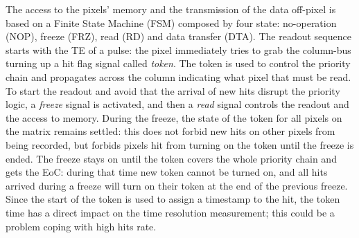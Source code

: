     The access to the pixels' memory and the transmission of the data off-pixel is based on a Finite State Machine (FSM) composed by four state: no-operation (NOP), freeze (FRZ), read (RD) and data transfer (DTA). The readout sequence starts with the TE of a pulse: the pixel immediately tries to grab the column-bus turning up a hit flag signal called \textit{token}.   
    The token is used to control the priority chain and propagates across the column indicating what pixel that must be read. To start the readout and avoid that the arrival of new hits disrupt the priority logic, a \textit{freeze} signal is activated, and then a \textit{read} signal controls the readout and the access to memory.
    During the freeze, the state of the token for all pixels on the matrix remains settled: this does not forbid new hits on other pixels from being recorded, but forbids pixels hit from turning on the token until the freeze is ended. 
    The freeze stays on until the token covers the whole priority chain and gets the EoC: during that time new token cannot be turned on, and all hits arrived during a freeze will turn on their token at the end of the previous freeze.  
    Since the start of the token is used to assign a timestamp to the hit, the token time has a direct impact on the time resolution measurement; this could be a problem coping with high hits rate. 

